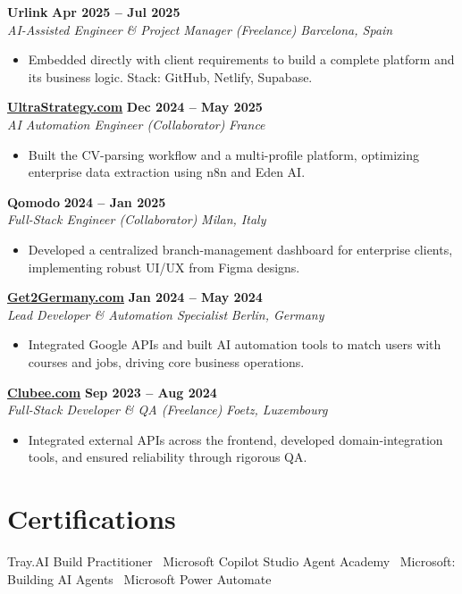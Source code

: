 \documentclass[a4paper,10pt]{article}
\newcommand{\role}[4]{%
 \textbf{#1} \hfill \textbf{#2}\\[1pt]%
 \textit{#3} \hfill \textit{#4}\\[2pt]%
}
\begin{document}
\role{Urlink}{Apr 2025 -- Jul 2025}{AI-Assisted Engineer \& Project Manager (Freelance)}{Barcelona, Spain}
\begin{itemize}
 \item Embedded directly with client requirements to build a complete platform and its business logic. Stack: GitHub, Netlify, Supabase.
\end{itemize}

\role{\href{https://ultrastrategy.com}{UltraStrategy.com}}{Dec 2024 -- May 2025}{AI Automation Engineer (Collaborator)}{France}
\begin{itemize}
 \item Built the CV-parsing workflow and a multi-profile platform, optimizing enterprise data extraction using n8n and Eden AI.
\end{itemize}

\role{Qomodo}{2024 -- Jan 2025}{Full-Stack Engineer (Collaborator)}{Milan, Italy}
\begin{itemize}
 \item Developed a centralized branch-management dashboard for enterprise clients, implementing robust UI/UX from Figma designs.
\end{itemize}

\role{\href{https://get2germany.com}{Get2Germany.com}}{Jan 2024 -- May 2024}{Lead Developer \& Automation Specialist}{Berlin, Germany}
\begin{itemize}
 \item Integrated Google APIs and built AI automation tools to match users with courses and jobs, driving core business operations.
\end{itemize}

\role{\href{https://clubee.com}{Clubee.com}}{Sep 2023 -- Aug 2024}{Full-Stack Developer \& QA (Freelance)}{Foetz, Luxembourg}
\begin{itemize}
 \item Integrated external APIs across the frontend, developed domain-integration tools, and ensured reliability through rigorous QA.
\end{itemize}

\section{Certifications}
Tray.AI Build Practitioner \textbullet\ Microsoft Copilot Studio Agent Academy \textbullet\ Microsoft: Building AI Agents \textbullet\ Microsoft Power Automate
\end{document}
